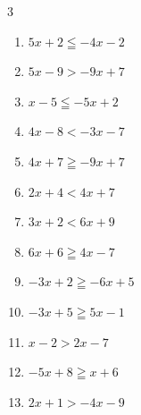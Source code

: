 \begin{multicols}{3}
\begin{enumerate}
        \phantom{$\displaystyle x>0$}

  \item $5x+2\leqq -4x-2$


  \item $5x-9>-9x+7$


  \item $x-5\leqq -5x+2$


  \item $4x-8<-3x-7$


  \item $4x+7\geqq -9x+7$

        \phantom{$\displaystyle x\geqq 0$}

  \item $2x+4<4x+7$


  \item $3x+2<6x+9$


  \item $6x+6\geqq 4x-7$


  \item $-3x+2\geqq -6x+5$

        \phantom{$\displaystyle x\geqq 1$}

  \item $-3x+5\geqq 5x-1$


  \item $x-2>2x-7$

        \phantom{$\displaystyle x<5$}

  \item $-5x+8\geqq x+6$


  \item $2x+1>-4x-9$



\end{enumerate}
\end{multicols}

